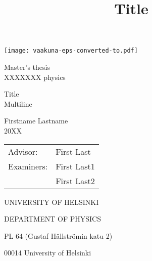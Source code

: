\documentclass[11pt,a4paper]{report}
\begin{document}
\begin{titlepage}
\setcounter{page}{1}

\begin{center}

\vspace*{4cm}
\texttt{[image: vaakuna-eps-converted-to.pdf]}

\vspace*{2cm}

Master's thesis  \\
XXXXXXX physics

\vspace{1cm} 
{\Large \bf
  \rule{0pt}{3ex} Title\\
  Multiline
}

\title{
Title}

\vspace{1cm} 
Firstname Lastname \\
20XX

\vspace{1.5cm} 
\begin{tabular}{ll}	Advisor: & 	First Last \\ 
			Examiners: &	First Last1 \\
				     &	First Last2
\end{tabular}

\vspace{1.5cm} UNIVERSITY OF HELSINKI

DEPARTMENT OF PHYSICS

\vspace{0.5cm} PL 64 (Gustaf H\"{a}llstr\"{o}min katu 2)

00014 University of Helsinki

\end{center}

\end{titlepage}
\end{document}
